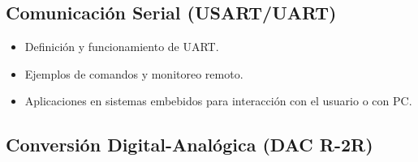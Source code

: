 \subsection{Comunicación Serial (USART/UART)}
\begin{itemize}
    \item Definición y funcionamiento de UART.
    \item Ejemplos de comandos y monitoreo remoto.
    \item Aplicaciones en sistemas embebidos para interacción con el usuario o con PC.
\end{itemize}


\subsection{Conversión Digital-Analógica (DAC R-2R)}
